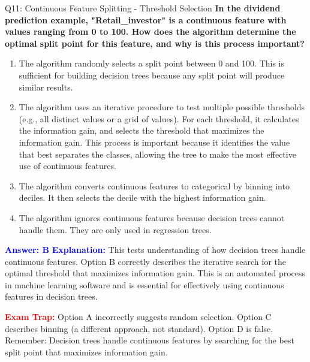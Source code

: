 \documentclass[8pt]{beamer}
\begin{document}
	\begin{frame}{Q11: Continuous Feature Splitting - Threshold Selection}
		\fontsize{6.5}{7.5}\selectfont
		\textbf{In the dividend prediction example, "Retail\_investor" is a continuous feature with values ranging from 0 to 100. How does the algorithm determine the optimal split point for this feature, and why is this process important?}
		
		\begin{enumerate}
			\item The algorithm randomly selects a split point between 0 and 100. This is sufficient for building decision trees because any split point will produce similar results.
			\item The algorithm uses an iterative procedure to test multiple possible thresholds (e.g., all distinct values or a grid of values). For each threshold, it calculates the information gain, and selects the threshold that maximizes the information gain. This process is important because it identifies the value that best separates the classes, allowing the tree to make the most effective use of continuous features.
			\item The algorithm converts continuous features to categorical by binning into deciles. It then selects the decile with the highest information gain.
			\item The algorithm ignores continuous features because decision trees cannot handle them. They are only used in regression trees.
		\end{enumerate}
		
		\vspace{0.1cm}
		\textcolor{blue}{\textbf{Answer: B}}
		\vspace{0.1cm}
		\textcolor{blue}{\textbf{Explanation:}} This tests understanding of how decision trees handle continuous features. Option B correctly describes the iterative search for the optimal threshold that maximizes information gain. This is an automated process in machine learning software and is essential for effectively using continuous features in decision trees.
		
		\textcolor{red}{\textbf{Exam Trap:}} Option A incorrectly suggests random selection. Option C describes binning (a different approach, not standard). Option D is false. Remember: Decision trees handle continuous features by searching for the best split point that maximizes information gain.
	\end{frame}
	
\end{document}
